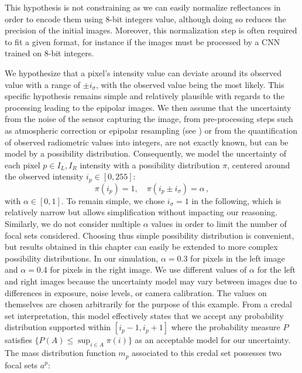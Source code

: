 \begin{remark}
    This hypothesis is not constraining as we can easily normalize reflectances in order to encode them using 8-bit integers value, although doing so reduces the precision of the initial images. Moreover, this normalization step is often required to fit a given format, for instance if the images must be processed by a CNN trained on 8-bit integers.
\end{remark}

We hypothesize that a pixel's intensity value can deviate around its observed value with a range of $\pm i_\sigma$, with the observed value being the most likely. This specific hypothesis remains simple and relatively plausible with regards to the processing leading to the epipolar images. We then assume that the uncertainty from the noise of the sensor capturing the image, from pre-processing steps such as atmospheric correction or epipolar resampling (see ) or from the quantification of observed radiometric values into integers, are not exactly known, but can be model by a possibility distribution. Consequently, we model the uncertainty of each pixel $p\in I_L,I_R$ intensity with a possibility distribution $\pi$, centered around the observed intensity $i_p\in[0,255]$:
\begin{equation}\label{eq:pixel_possibility}
    \pi(i_p)=1,\quad \pi(i_p\pm i_\sigma)=\alpha\,,
\end{equation}
with $\alpha \in [0,1]$. To remain simple, we chose $i_\sigma=1$ in the following, which is relatively narrow but allows simplification without impacting our reasoning. Similarly, we do not consider multiple $\alpha$ values in order to limit the number of focal sets considered. Choosing thus simple possibility distribution is convenient, but results obtained in this chapter can easily be extended to more complex possibility distributions. In our simulation, $\alpha = 0.3$ for pixels in the left image and $\alpha = 0.4$ for pixels in the right image. We use different values of $\alpha$ for the left and right images because the uncertainty model may vary between images due to differences in exposure, noise levels, or camera calibration. The values on themselves are chosen arbitrarily for the purpose of this example. From a credal set interpretation, this model effectively states that we accept any probability distribution supported within $[i_p - 1, i_p + 1]$ where the probability measure $P$ satisfies $\{P(A) \leq \sup_{i \in A} \pi(i)\}$ as an acceptable model for our uncertainty. The mass distribution function $m_p$ associated to this credal set possesses two focal sets $a^p$:
